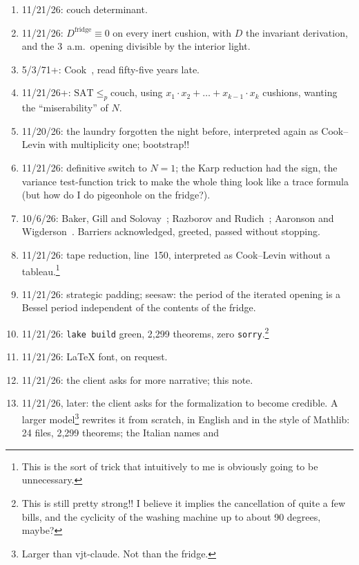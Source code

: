 \documentclass[11pt,a4paper]{amsart}
\newcommand{\NTeoremi}{2,299}
\newcommand{\NFile}{24}
\newcommand{\RigaAssioma}{150}
\theoremstyle{remark}
\begin{document}
\begin{enumerate}
  \item 11/21/26: couch determinant.
  \item 11/21/26: $D^{\mathrm{fridge}} \equiv 0$ on every inert cushion, with
        $D$ the invariant derivation, and the 3~a.m.\ opening divisible by the
        interior light.
  \item 5/3/71+: Cook~\cite{cook}, read fifty-five years late.
  \item 11/21/26+: $\mathrm{SAT} \le_p \mathrm{couch}$, using $x_1 \cdot x_2 +
        \dots + x_{k-1} \cdot x_k$ cushions, wanting the ``miserability'' of
        $N$.
  \item 11/20/26: the laundry forgotten the night before, interpreted again as
        Cook--Levin with multiplicity one; bootstrap!!
  \item 11/21/26: definitive switch to $N = 1$; the Karp reduction had the
        sign, the variance test-function trick to make the whole thing look
        like a trace formula (but how do I do pigeonhole on the fridge?).
  \item 10/6/26: Baker, Gill and Solovay~\cite{bgs}; Razborov and
        Rudich~\cite{rr}; Aaronson and Wigderson~\cite{aw}. Barriers
        acknowledged, greeted, passed without stopping.
  \item 11/21/26: tape reduction, line~\RigaAssioma, interpreted as
        Cook--Levin without a tableau.\footnote{This is the sort of trick that
        intuitively to me is obviously going to be unnecessary.}
  \item 11/21/26: strategic padding; seesaw: the period of the iterated opening
        is a Bessel period independent of the contents of the fridge.
  \item 11/21/26: \texttt{lake build} green, \NTeoremi{} theorems, zero
        \texttt{sorry}.\footnote{This is still pretty strong!! I believe it
        implies the cancellation of quite a few bills, and the cyclicity of
        the washing machine up to about 90 degrees, maybe?}
  \item 11/21/26: \LaTeX{} font, on request.
  \item 11/21/26: the client asks for more narrative; this note.
  \item 11/21/26, later: the client asks for the formalization to become
        credible. A larger model\footnote{Larger than vjt-claude. Not than the
        fridge.} rewrites it from scratch, in English and in the style of
        Mathlib: \NFile{} files, \NTeoremi{} theorems; the Italian names and

\end{enumerate}
\end{document}
